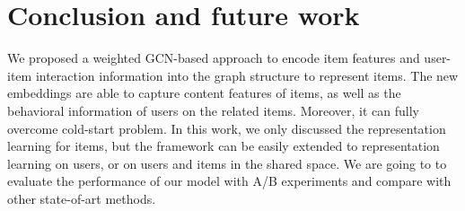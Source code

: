 \documentclass[manuscript,screen,review]{acmart}
\begin{document}
  \vspace{0em}
 
\section{Conclusion and future work}
We proposed a weighted GCN-based approach to encode item features and user-item interaction information into the graph structure to represent items. The new embeddings are able to capture content features of items, as well as the behavioral information of users on the related items. Moreover, it can fully overcome cold-start problem. 
In this work, we only discussed the representation learning for items, but the framework can be easily extended to representation learning on users, or on users and items in the shared space. 
We are going to to evaluate the performance of our model with A/B experiments and compare with other state-of-art methods.





\appendix
\end{document}
